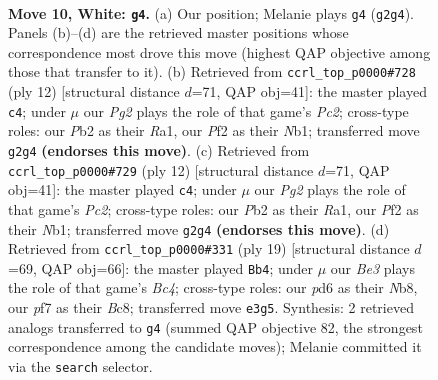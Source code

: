 \documentclass[11pt]{article}
\begin{document}
\clearpage

\begin{figure}[p]\centering
\begin{subfigure}{0.46\textwidth}\centering
\resizebox{\linewidth}{!}{%
\newchessgame
\chessboard[
  setfen={rn1qkb1r/5p2/b2p1np1/2pPp2p/4P3/2N1B3/PP1K1PPP/R2Q1BNR w kq - 0 10},
  showmover=false,
  pgfstyle=straightmove, color=movearrow, markmove={g2-g4}
]}
\caption{}
\end{subfigure}\hfill
\begin{subfigure}{0.46\textwidth}\centering
\resizebox{\linewidth}{!}{%
\newchessgame
\chessboard[
  setfen={r1bqkb1r/pp1n1ppp/4p2n/2PpP3/8/4BN2/PPP2PPP/RN1QKB1R w KQkq - 4 7},
  showmover=false,
  pgfstyle=straightmove, color=movearrow, markmove={c2-c4}
]}
\caption{}
\end{subfigure}
\\[4pt]
\begin{subfigure}{0.46\textwidth}\centering
\resizebox{\linewidth}{!}{%
\newchessgame
\chessboard[
  setfen={r1bqkb1r/pp1n1ppp/4p2n/2PpP3/8/4BN2/PPP2PPP/RN1QKB1R w KQkq - 4 7},
  showmover=false,
  pgfstyle=straightmove, color=movearrow, markmove={c2-c4}
]}
\caption{}
\end{subfigure}\hfill
\begin{subfigure}{0.46\textwidth}\centering
\resizebox{\linewidth}{!}{%
\newchessgame
\chessboard[
  setfen={rnb2rk1/pp3ppp/1q3n2/2bP4/4p3/2N1P1P1/PP1N1P1P/R1BQKB1R b KQ - 1 10},
  showmover=false,
  pgfstyle=straightmove, color=movearrow, markmove={c5-b4}
]}
\caption{}
\end{subfigure}
\caption{\textbf{Move 10, White: \texttt{g4}.} (a) Our position; Melanie plays \texttt{g4} (\texttt{g2g4}). Panels (b)--(d) are the retrieved master positions whose correspondence most drove this move (highest QAP objective among those that transfer to it). (b) Retrieved from \texttt{ccrl\_top\_p0000\#728} (ply 12) [structural distance $d$=71, QAP obj=41]: the master played \texttt{c4}; under $\mu$ our \emph{Pg2} plays the role of that game's \emph{Pc2}; cross-type roles: our \emph{P}b2 as their \emph{R}a1, our \emph{P}f2 as their \emph{N}b1; transferred move \texttt{g2g4} \textbf{(endorses this move)}. (c) Retrieved from \texttt{ccrl\_top\_p0000\#729} (ply 12) [structural distance $d$=71, QAP obj=41]: the master played \texttt{c4}; under $\mu$ our \emph{Pg2} plays the role of that game's \emph{Pc2}; cross-type roles: our \emph{P}b2 as their \emph{R}a1, our \emph{P}f2 as their \emph{N}b1; transferred move \texttt{g2g4} \textbf{(endorses this move)}. (d) Retrieved from \texttt{ccrl\_top\_p0000\#331} (ply 19) [structural distance $d$=69, QAP obj=66]: the master played \texttt{Bb4}; under $\mu$ our \emph{Be3} plays the role of that game's \emph{Bc4}; cross-type roles: our \emph{p}d6 as their \emph{N}b8, our \emph{p}f7 as their \emph{B}c8; transferred move \texttt{e3g5}. Synthesis: 2 retrieved analogs transferred to \texttt{g4} (summed QAP objective 82, the strongest correspondence among the candidate moves); Melanie committed it via the \texttt{search} selector.}
\label{fig:thought-m18}
\end{figure}
\end{document}
